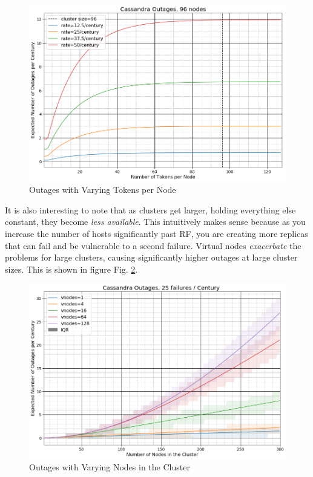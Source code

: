 \documentclass{article}
\begin{document}
\begin{figure}[h!]
    \centering
    \includegraphics[width=1.0\textwidth]{images/outages_all_vnodes.png}
    \caption{Outages with Varying Tokens per Node}
    \label{fig:outages_all_vnodes}
\end{figure}

It is also interesting to note that as clusters get larger, holding everything
else constant, they become \textit{less available}. This intuitively makes
sense because as you increase the number of hosts significantly past RF,
you are creating more replicas that can fail and be vulnerable to a second
failure. Virtual nodes \textit{exacerbate} the problems for large clusters, causing significantly higher outages at large cluster sizes. This is shown in figure Fig. \ref{fig:outages_nodes}.

\begin{figure}[H]
    \centering
    \includegraphics[width=1.0\textwidth]{images/outages_nodes.png}
    \caption{Outages with Varying Nodes in the Cluster}
    \label{fig:outages_nodes}
\end{figure}
\end{document}
